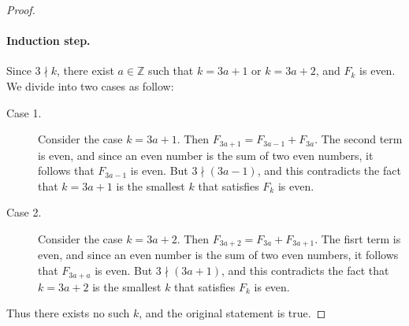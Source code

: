 \documentclass{exam}
\begin{document}
\begin{proof}
    \paragraph{Induction step.} Since $3\nmid k$, there exist $a\in\mathbb Z$ such that $k = 3a + 1$ or $k = 3a + 2$, and $F_k$ is even. We divide into two cases as follow:
    \begin{description}
        \item[Case 1.] Consider the case $k = 3a + 1$. Then $F_{3a + 1} = F_{3a-1} + F_{3a}$. The second term is even, and since an even number is the sum of two even numbers, it follows that $F_{3a-1}$ is even. But $3\nmid(3a-1)$, and this contradicts the fact that $k = 3a + 1$ is the smallest $k$ that satisfies $F_k$ is even.
        \item[Case 2.] Consider the case $k = 3a + 2$. Then $F_{3a + 2} = F_{3a} + F_{3a + 1}$. The fisrt term is even, and since an even number is the sum of two even numbers, it follows that $F_{3a+a}$ is even. But $3\nmid(3a+1)$, and this contradicts the fact that $k = 3a + 2$ is the smallest $k$ that satisfies $F_k$ is even.
    \end{description}
    Thus there exists no such $k$, and the original statement is true.
\end{proof}
\end{document}
